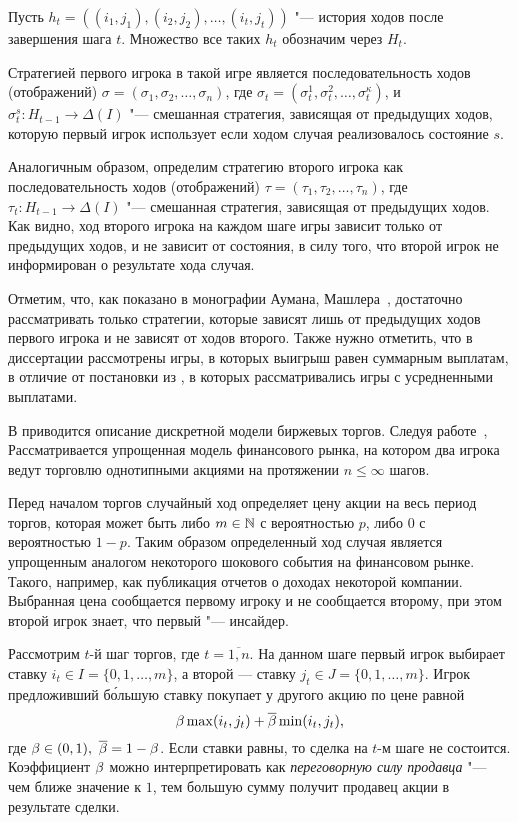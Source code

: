 Пусть $h_t = \left((i_1, j_1), (i_2, j_2), \ldots, (i_t, j_t)\right)$ "--- история ходов после завершения шага $t$.
Множество все таких $h_t$ обозначим через $H_t$. 

Стратегией первого игрока в такой игре является последовательность ходов (отображений) $\sigma = (\sigma_1, \sigma_2, \ldots, \sigma_n)$, где $\sigma_t = (\sigma^1_t, \sigma^2_t, \ldots, \sigma^\kappa_t)$, и $\sigma^s_t: H_{t-1} \rightarrow \Delta(I)$ "--- смешанная стратегия, зависящая от предыдущих ходов, которую первый игрок использует если ходом случая реализовалось состояние $s$.

Аналогичным образом, определим стратегию второго игрока как последовательность ходов (отображений) $\tau = (\tau_1, \tau_2, \ldots, \tau_n)$, где $\tau_t: H_{t-1} \rightarrow \Delta(I)$ "--- смешанная стратегия, зависящая от предыдущих ходов.
Как видно, ход второго игрока на каждом шаге игры зависит только от предыдущих ходов, и не зависит от состояния, в силу того, что второй игрок не информирован о результате хода случая.

Отметим, что, как показано в монографии Аумана, Машлера~\cite{aumann95}, достаточно рассматривать только стратегии, которые зависят лишь от предыдущих ходов первого игрока и не зависят от ходов второго.
%
Также нужно отметить, что в диссертации рассмотрены игры, в которых выигрыш равен суммарным выплатам, в отличие от постановки из \cite{aumann95}, в которых рассматривались игры с усредненными выплатами.

В  приводится описание дискретной модели биржевых торгов.
Следуя работе~\cite{domansky07}, Рассматривается упрощенная модель финансового рынка, на котором два игрока ведут торговлю однотипными акциями на протяжении $n \leqslant \infty$ шагов.

Перед началом торгов случайный ход определяет цену акции на весь период торгов, которая может быть либо $m \in \mathbb{N}$ с вероятностью $p$, либо $0$ с вероятностью $1-p$.
Таким образом определенный ход случая является упрощенным аналогом некоторого шокового события на финансовом рынке.
Такого, например, как публикация отчетов о доходах некоторой компании.
Выбранная цена сообщается первому игроку и не сообщается второму, при этом второй игрок знает, что первый "--- инсайдер.

Рассмотрим $t$-й шаг торгов, где $t = \overline{1,n}$.
На данном шаге первый игрок выбирает ставку $i_t \in I = \{0, 1, \ldots, m\}$, а второй --- ставку $j_t \in J = \{0, 1, \ldots, m\}$.
Игрок предложивший б\'{о}льшую ставку покупает у другого акцию по цене равной
\[
  \beta \max(i_t, j_t) + {\overline{\beta}} \min(i_t, j_t),
\]
где $\beta \in (0, 1),\ {\overline{\beta}} = 1 - \beta$.
Если ставки равны, то сделка на $t$-м шаге не состоится.
Коэффициент $\beta$ можно интерпретировать как \emph{переговорную силу продавца} "--- чем ближе значение к $1$, тем большую сумму получит продавец акции в результате сделки.

